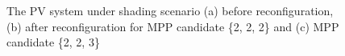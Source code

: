 \documentclass[conference]{IEEEtran}
\begin{document}
\begin{figure}
\centering 
{} \\
 \\
\caption{The PV system under shading scenario (a) before reconfiguration, (b) after reconfiguration for MPP candidate \{2, 2, 2\} and (c) MPP candidate \{2, 2, 3\}} 
\end{figure}

\end{document}
